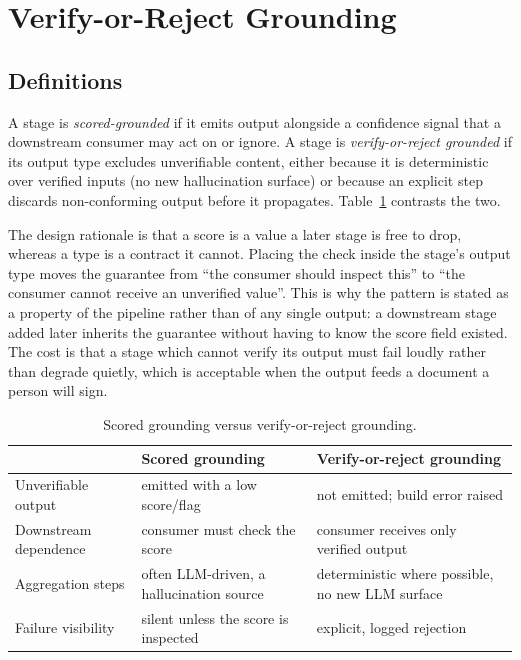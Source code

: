 \documentclass[conference]{IEEEtran}
\begin{document}
\section{Verify-or-Reject Grounding}
\subsection{Definitions}
A stage is \emph{scored-grounded} if it emits output alongside a confidence
signal that a downstream consumer may act on or ignore. A stage is
\emph{verify-or-reject grounded} if its output type excludes unverifiable
content, either because it is deterministic over verified inputs (no new
hallucination surface) or because an explicit step discards non-conforming
output before it propagates. Table~\ref{tab:contrast} contrasts the two.

The design rationale is that a score is a value a later stage is free to drop,
whereas a type is a contract it cannot. Placing the check inside the stage's
output type moves the guarantee from ``the consumer should inspect this'' to
``the consumer cannot receive an unverified value''. This is why the pattern is
stated as a property of the pipeline rather than of any single output: a
downstream stage added later inherits the guarantee without having to know the
score field existed. The cost is that a stage which cannot verify its output
must fail loudly rather than degrade quietly, which is acceptable when the
output feeds a document a person will sign.

\begin{table}[t]
\centering
\caption{Scored grounding versus verify-or-reject grounding.}
\label{tab:contrast}
\begin{tabular}{@{}lll@{}}
\toprule
 & \textbf{Scored grounding} & \textbf{Verify-or-reject grounding} \\
\midrule
Unverifiable output & emitted with a low score/flag & not emitted; build error raised \\
Downstream dependence & consumer must check the score & consumer receives only verified output \\
Aggregation steps & often LLM-driven, a hallucination source & deterministic where possible, no new LLM surface \\
Failure visibility & silent unless the score is inspected & explicit, logged rejection \\
\bottomrule
\end{tabular}
\end{table}
\end{document}
